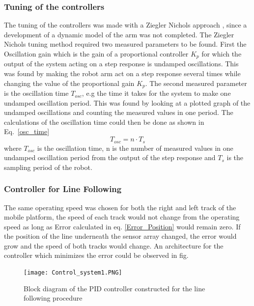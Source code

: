 \subsubsection{Tuning of the controllers}
The tuning of the controllers was made with a Ziegler Nichols approach \parencite{FeedbackControl}, since a development of a dynamic model of the arm was not completed. The Ziegler Nichols tuning method required two measured parameters to be found. First the Oscillation gain which is the gain of a proportional controller \(K_p\) for which the output of the system acting on a step response is undamped oscillations. This was found by making the robot arm act on a step response several times while changing the value of the proportional gain \(K_p\). The second measured parameter is the oscillation time \(T_{osc}\), e.g the time it takes for the system to make one undamped oscillation period. This was found by looking at a plotted graph of the undamped oscillations and counting the measured values in one period. The calculations of the oscillation time could then be done as shown in Eq.~\eq\ref{osc_time}
\begin{equation}
    T_{osc} = n\cdot T_s
    \label{osc_time}
\end{equation}
where \(T_{osc}\) is the oscillation time, n is the number of measured values in one undamped oscillation period from the output of the step response and \(T_s\) is the sampling period of the robot.

\subsubsection{Controller for Line Following}
The same operating speed was chosen for both the right and left track of the mobile platform, the speed of each track would not change from the operating speed as long as Error calculated in eq. \ref{Error_Position} would remain zero. If the position of the line underneath the sensor array changed, the error would grow and the speed of both tracks would change. An architecture for the controller which minimizes the error could be observed in fig.

\begin{figure}[H]
    \centering
    \texttt{[image: Control\_system1.PNG]}
    \caption{Block diagram of the PID controller constructed for the line following procedure}
    \label{Control_system1}
\end{figure}

